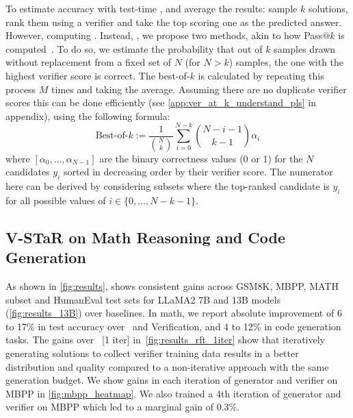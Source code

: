 \label{sec:verifier_k}
To estimate accuracy with test-time ,  and average the results: sample $k$ solutions, rank them using a verifier and take the top scoring one as the predicted answer. However, computing . Instead, , we propose two methods, akin to how Pass$@k$ is computed~\citep{chen2021codex}. 
To do so, we estimate the probability that out of $k$ samples drawn without replacement from a fixed set of $N$ (for $N > k$) samples, the one with the highest verifier score is correct. The best-of-$k$ is calculated by repeating this process $M$ times and taking the average. Assuming there are no duplicate verifier scores this can be done efficiently (see \autoref{app:ver_at_k_understand_pls} in appendix), using the following formula:
\begin{equation}
    \text{Best-of-}k := \frac{1}{\binom{N}{k}}\sum_{i=0}^{N-k} \binom{N-i-1}{k-1}\alpha_i
    \label{eq:ver_at_k}
\end{equation}
where $[\alpha_0, \dots, \alpha_{N-1}]$ are the binary correctness values (0 or 1) for the $N$ candidates $y_i$ sorted in decreasing order by their verifier score. The numerator here can be derived by considering subsets where the top-ranked candidate is $y_i$ for all possible values of $i \in \{0,\dots,N-k-1\}$.


\subsection{V-STaR on Math Reasoning and Code Generation}
As shown in \autoref{fig:results}, \vstar{} shows consistent gains across GSM8K, MBPP, MATH subset and HumanEval test sets for LLaMA2 7B and 13B models (\autoref{fig:results_13B}) over baselines.
In math, we report absolute improvement of 6 to 17\% in test accuracy over \stardag~and Verification, and 4 to 12\% in code generation tasks.
The gains over \vstar{}~[1 iter] in~\autoref{fig:results_rft_1iter} show that iteratively generating solutions to collect verifier training data results in a better distribution and quality compared to a non-iterative approach with the same generation budget. 
We show gains in each iteration of generator and verifier on MBPP in \autoref{fig:mbpp_heatmap}. 
We also trained a 4th iteration of generator and verifier on MBPP which led to a marginal gain of 0.3\%.

